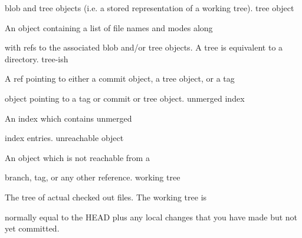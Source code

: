 blob and tree objects (i.e. a stored representation of a working tree).
tree object

An object containing a list of file names and modes along

with refs to the associated blob and/or tree objects. A
tree is equivalent to a directory.
tree-ish

A ref pointing to either a commit object, a tree object, or a tag

object pointing to a tag or commit or tree object.
unmerged index

An index which contains unmerged

index entries.
unreachable object

An object which is not reachable from a

branch, tag, or any other reference.
working tree

The tree of actual checked out files. The working tree is

normally equal to the HEAD plus any local changes
that you have made but not yet committed.

